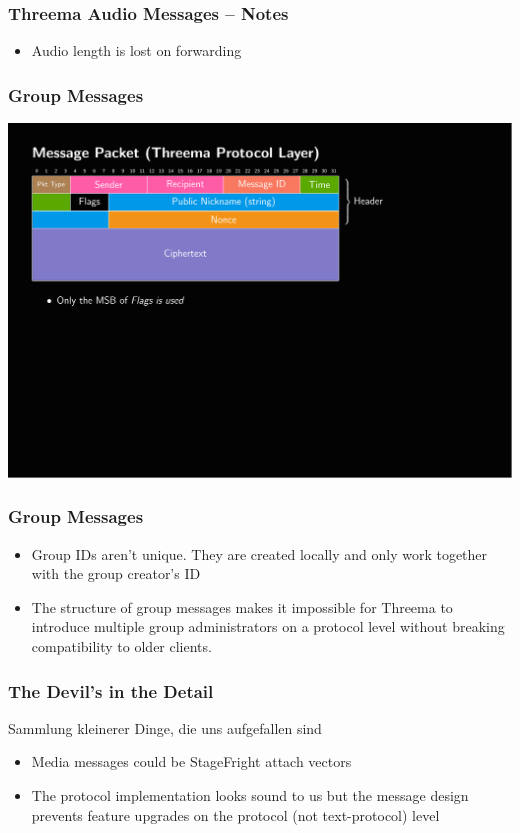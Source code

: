 \documentclass[
	aspectratio=169,
	xetex,
]{beamer}
\begin{document}
\begin{frame}
	\frametitle{Threema Audio Messages -- Notes}
	\begin{itemize}
		\item Audio length is lost on forwarding
	\end{itemize}
\end{frame}

\begin{frame}
	\frametitle{Group Messages}
	\includegraphics[page=6,clip,trim={.99cm 7.5cm 3.2cm 1.8cm},width=\textwidth]{out/messages.pdf}
\end{frame}

\begin{frame}
	\frametitle{Group Messages}
	\begin{itemize}
		\item Group IDs aren't unique. They are created locally and only work together with the group creator's ID
		\item The structure of group messages makes it impossible for Threema to introduce multiple group administrators on a protocol level without breaking compatibility to older clients.
	\end{itemize}
\end{frame}

\begin{frame}
	\frametitle{The Devil's in the Detail}
	Sammlung kleinerer Dinge, die uns aufgefallen sind
	\begin{itemize}
		\item Media messages could be StageFright attach vectors
		\item The protocol implementation looks sound to us but the message design prevents feature upgrades on the protocol (not text-protocol) level

	\end{itemize}
\end{frame}
\end{document}
